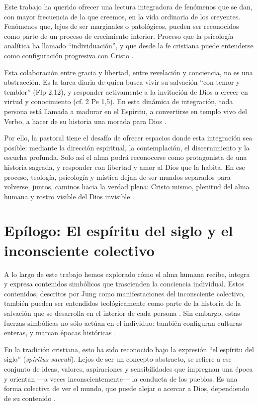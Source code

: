 Este trabajo ha querido ofrecer una lectura integradora de fenómenos que se dan, con mayor frecuencia de la que creemos, en la vida ordinaria de los creyentes. Fenómenos que, lejos de ser marginales o patológicos, pueden ser reconocidos como parte de un proceso de crecimiento interior. Proceso que la psicología analítica ha llamado “individuación”, y que desde la fe cristiana puede entenderse como configuración progresiva con Cristo \cite{jung1959}.

Esta colaboración entre gracia y libertad, entre revelación y conciencia, no es una abstracción. Es la tarea diaria de quien busca vivir su salvación “con temor y temblor” (Flp 2,12), y responder activamente a la invitación de Dios a crecer en virtud y conocimiento (cf. 2 Pe 1,5). En esta dinámica de integración, toda persona está llamada a madurar en el Espíritu, a convertirse en templo vivo del Verbo, a hacer de su historia una morada para Dios \cite{jung1959}.

Por ello, la pastoral tiene el desafío de ofrecer espacios donde esta integración sea posible: mediante la dirección espiritual, la contemplación, el discernimiento y la escucha profunda. Solo así el alma podrá reconocerse como protagonista de una historia sagrada, y responder con libertad y amor al Dios que la habita. En ese proceso, teología, psicología y mística dejan de ser mundos separados para volverse, juntos, caminos hacia la verdad plena: Cristo mismo, plenitud del alma humana y rostro visible del Dios invisible \cite{jung1959}.

\section*{Epílogo: El espíritu del siglo y el inconsciente colectivo}

A lo largo de este trabajo hemos explorado cómo el alma humana recibe, integra y expresa contenidos simbólicos que trascienden la conciencia individual. Estos contenidos, descritos por Jung como manifestaciones del inconsciente colectivo, también pueden ser entendidos teológicamente como parte de la historia de la salvación que se desarrolla en el interior de cada persona \cite{jung1959}. Sin embargo, estas fuerzas simbólicas no sólo actúan en el individuo: también configuran culturas enteras, y marcan épocas históricas \cite{jung1959}.

En la tradición cristiana, esto ha sido reconocido bajo la expresión “el espíritu del siglo” (\textit{spiritus saeculi}). Lejos de ser un concepto abstracto, se refiere a ese conjunto de ideas, valores, aspiraciones y sensibilidades que impregnan una época y orientan —a veces inconscientemente— la conducta de los pueblos. Es una forma colectiva de ver el mundo, que puede alejar o acercar a Dios, dependiendo de su contenido \cite{jung1959}.

